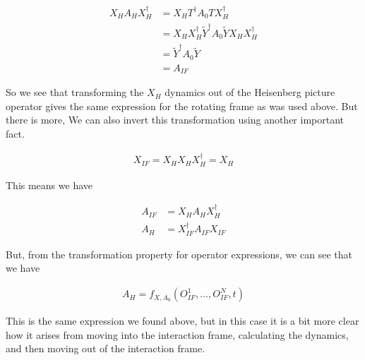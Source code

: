 \documentclass[12pt]{article}
\begin{document}
\begin{align}
X_H A_H X_H^{\dag} &= X_H T^{\dag} A_0 T X_H^{\dag}\\
&= X_H X_H^{\dag} \tilde{Y}^{\dag} A_0 \tilde{Y} X_H X_H^{\dag}\\
&= \tilde{Y}^{\dag} A_0 \tilde{Y}\\
&= A_{IF}
\end{align}

So we see that transforming the $X_H$ dynamics out of the Heisenberg picture operator gives the same expression for the rotating frame as was used above. But there is more, We can also invert this transformation using another important fact.

\begin{align}
X_{IF} = X_H X_H X_H^{\dag} = X_H
\end{align}

This means we have

\begin{align}
A_{IF} &= X_H A_H X_H^{\dag}\\
A_H &= X_{IF}^{\dag} A_{IF} X_{IF}
\end{align}

But, from the transformation property for operator expressions, we can see that we have

\begin{align}
A_H = f_{X,A_0}\left(O_{IF}^1,\ldots,O_{IF}^N,t \right)
\end{align}

This is the same expression we found above, but in this case it is a bit more clear how it arises from moving into the interaction frame, calculating the dynamics, and then moving out of the interaction frame.
\end{document}
